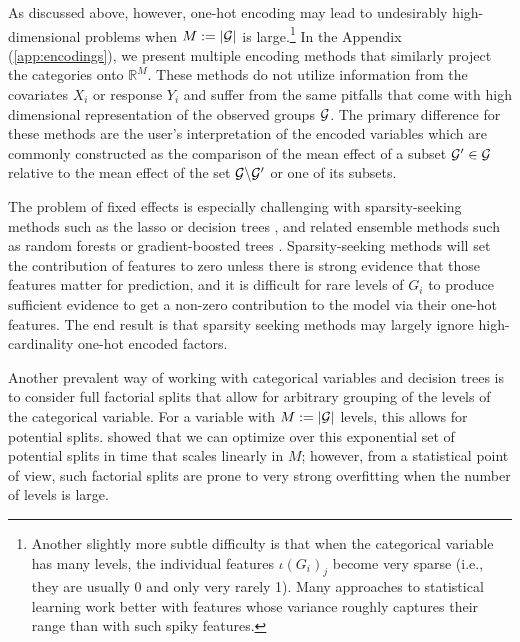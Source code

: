 \documentclass{article}
\theoremstyle{plain}
\theoremstyle{definition}
\theoremstyle{remark}
\begin{document}
As discussed above, however, one-hot encoding may lead to undesirably high-dimensional problems when $M := \left\lvert\mathcal{G}\right\rvert$ is large.\footnote{Another slightly more subtle difficulty is that when the categorical variable has many levels, the individual features $\iota(G_i)_j$ become very sparse (i.e., they are usually
0 and only very rarely 1). Many approaches to statistical learning work better with features whose
variance roughly captures their range than with such spiky features.} In the  Appendix (\ref{app:encodings}),
we present multiple encoding methods that similarly project the categories onto $\mathbb{R}^{M}$.
These methods do not utilize information from the covariates $X_i$ or response $Y_i$ and suffer from the same pitfalls that
come with high dimensional representation of the observed groups $\mathcal{G}$. The primary difference for
these methods are the user's interpretation of the encoded variables which are commonly constructed as the comparison of
 the mean effect of a subset $\mathcal{G}' \in \mathcal{G}$ relative to the mean effect of the set $\mathcal{G} \backslash \mathcal{G}'$ or one of its subsets.


The problem of fixed effects is especially challenging with sparsity-seeking methods such as the
lasso \citep{hastie2015statistical} or decision trees \citep{breiman1984classification}, and related
ensemble methods such as random forests \citep{breiman2001random} or gradient-boosted
trees \citep{friedman2001greedy}. Sparsity-seeking methods will set the contribution of features
to zero unless there is strong evidence that those features matter for prediction, and it is difficult
for rare levels of $G_i$ to produce sufficient evidence to get a non-zero contribution to the model
via their one-hot features. The end result is that sparsity seeking methods may largely ignore high-cardinality
one-hot encoded factors.

Another prevalent way of working with categorical variables and decision trees
is to consider full factorial splits that allow for arbitrary grouping of the levels of the categorical
variable. For a variable with $M := \left\lvert\mathcal{G}\right\rvert$ levels, this allows
for  potential splits. \citet{breiman1984classification} showed that
we can optimize over this exponential set of potential splits in time that scales linearly in $M$;
however, from a statistical point of view, such factorial splits are prone to very strong overfitting
when the number of levels is large.
\end{document}
